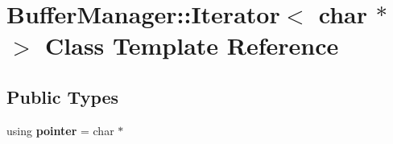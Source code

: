 \hypertarget{class_buffer_manager_1_1_iterator_3_01char_01_5_01_4}{}\section{Buffer\+Manager\+::Iterator$<$ char $\ast$ $>$ Class Template Reference}
\label{class_buffer_manager_1_1_iterator_3_01char_01_5_01_4}
\subsection*{Public Types}
\begin{DoxyCompactItemize}
\item 
\mbox{\label{class_buffer_manager_1_1_iterator_3_01char_01_5_01_4_a2241d01688c2d5b7e9e5d1d720b73b08}} 
using {\bfseries pointer} = char $\ast$
\end{DoxyCompactItemize}
